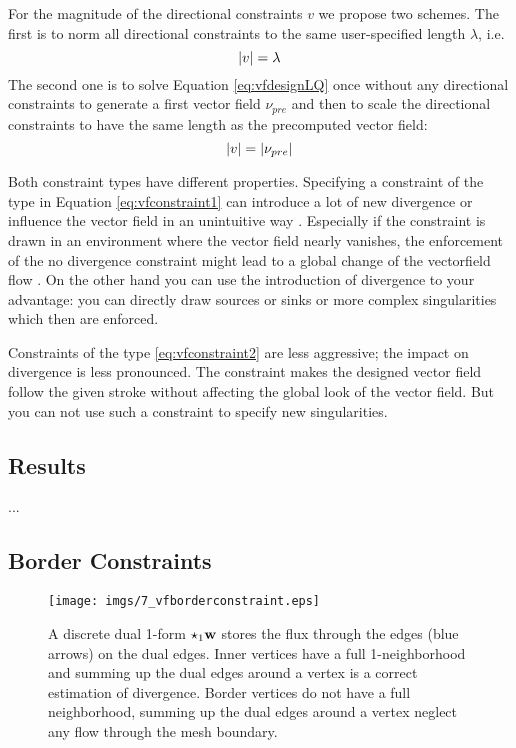 For the magnitude of the directional constraints $v$ we propose two schemes. The first is to norm all directional constraints to the same user-specified length $\lambda$, i.e.
\begin{equation} \left| v \right| = \lambda \label{eq:vfconstraint1}\end{equation}
The second one is to solve Equation \ref{eq:vfdesignLQ} once without any directional constraints to generate a first vector field $\nu_{pre}$ and then to scale the directional constraints to have the same length as the precomputed vector field:
\begin{equation} \left| v \right| = \left| \nu_{pre} \right| \label{eq:vfconstraint2}\end{equation}

Both constraint types have different properties. Specifying a constraint of the type in Equation \ref{eq:vfconstraint1} can introduce a lot of new divergence or influence the vector field in an unintuitive way . Especially if the constraint is drawn in an environment where the vector field nearly vanishes, the enforcement of the no divergence constraint might lead to a global change of the vectorfield flow . On the other hand you can use the introduction of divergence to your advantage: you can directly draw sources or sinks or more complex singularities which then are enforced.

Constraints of the type \ref{eq:vfconstraint2} are less aggressive; the impact on divergence is less pronounced. The constraint makes the designed vector field  follow the given stroke without affecting the global look of the vector field. But you can not use such a constraint to specify new singularities.

\subsection{Results}
...

\subsection{Border Constraints}
\begin{figure}%
\begin{center}
\texttt{[image: imgs/7\_vfborderconstraint.eps]}%
\end{center}
\caption{A discrete dual 1-form $\star_1\textbf{w}$ stores the flux through the edges (blue arrows) on the dual edges. Inner vertices have a full 1-neighborhood and summing up the dual edges around a vertex is a correct estimation of divergence. Border vertices do not have a full neighborhood, summing up the dual edges around a vertex neglect any flow through the mesh boundary.}%
\label{fig:vf_borderconstr}%
\end{figure}

